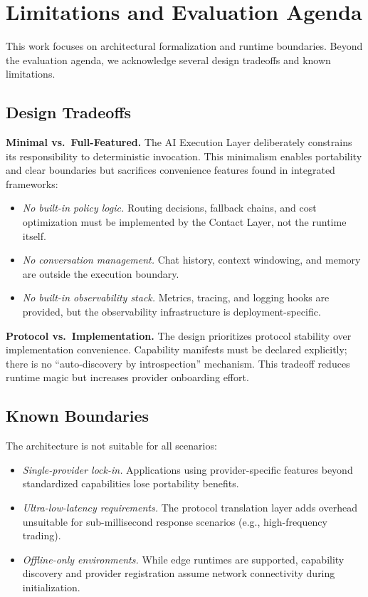 \section{Limitations and Evaluation Agenda}

This work focuses on architectural formalization and runtime boundaries. Beyond the evaluation agenda, we acknowledge several design tradeoffs and known limitations.

\subsection{Design Tradeoffs}

\textbf{Minimal vs.\ Full-Featured.} The AI Execution Layer deliberately constrains its responsibility to deterministic invocation. This minimalism enables portability and clear boundaries but sacrifices convenience features found in integrated frameworks:
\begin{itemize}
    \item \emph{No built-in policy logic.} Routing decisions, fallback chains, and cost optimization must be implemented by the Contact Layer, not the runtime itself.
    \item \emph{No conversation management.} Chat history, context windowing, and memory are outside the execution boundary.
    \item \emph{No built-in observability stack.} Metrics, tracing, and logging hooks are provided, but the observability infrastructure is deployment-specific.
\end{itemize}

\textbf{Protocol vs.\ Implementation.} The design prioritizes protocol stability over implementation convenience. Capability manifests must be declared explicitly; there is no ``auto-discovery by introspection'' mechanism. This tradeoff reduces runtime magic but increases provider onboarding effort.

\subsection{Known Boundaries}

The architecture is not suitable for all scenarios:
\begin{itemize}
    \item \emph{Single-provider lock-in.} Applications using provider-specific features beyond standardized capabilities lose portability benefits.
    \item \emph{Ultra-low-latency requirements.} The protocol translation layer adds overhead unsuitable for sub-millisecond response scenarios (e.g., high-frequency trading).
    \item \emph{Offline-only environments.} While edge runtimes are supported, capability discovery and provider registration assume network connectivity during initialization.
\end{itemize}

